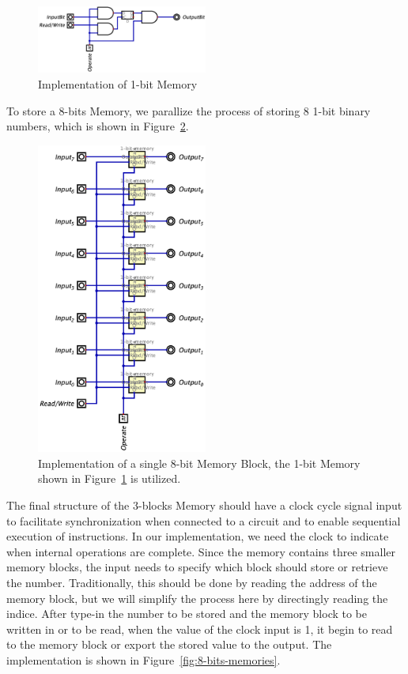 \documentclass[conference]{IEEEtran}
\begin{document}
\begin{figure}[h!]
    \centering
    \includegraphics[width=0.5\textwidth]{assets/1-bit-memory.png}
    \caption{Implementation of 1-bit Memory}
    \label{fig:1-bit-memory}
\end{figure}

To store a 8-bits Memory, we parallize the process of storing 8 1-bit binary numbers, which is shown in Figure~\ref{fig:8-bits-memory}.

\begin{figure}[h!]
    \centering
    \includegraphics[width=0.5\textwidth]{assets/8-bit-memory.png}
    \caption{Implementation of a single 8-bit Memory Block, the 1-bit Memory shown in Figure~\ref{fig:1-bit-memory} is utilized.}
    \label{fig:8-bits-memory}
\end{figure}

The final structure of the 3-blocks Memory should have a clock cycle signal input to facilitate synchronization when connected to a circuit and to enable sequential execution of instructions. In our implementation, we need the clock to indicate when internal operations are complete. Since the memory contains three smaller memory blocks, the input needs to specify which block should store or retrieve the number.
Traditionally, this should be done by reading the address of the memory block, but we will simplify the process here by directingly reading the indice. After type-in the number to be stored and the memory block to be written in or to be read, when the value of the clock input is 1, it begin to read to the memory block or export the stored value to the output. The implementation is shown in Figure~\ref{fig:8-bits-memories}.
\end{document}
